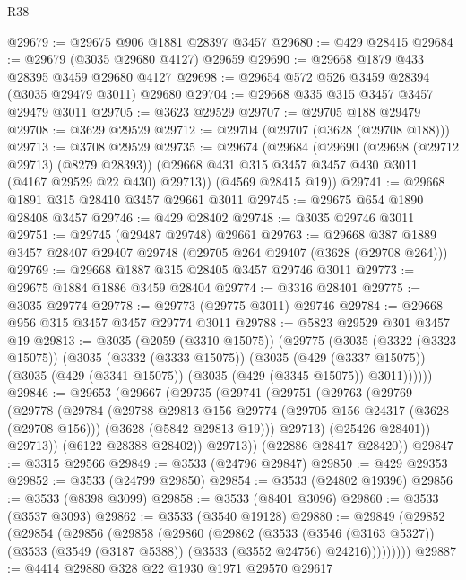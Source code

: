\begin{lexlean}{R38}
\begin{coremodule}
@29679 := @29675 @906 @1881 @28397 @3457
@29680 := @429 @28415
@29684 := @29679 (@3035 @29680 @4127) @29659
@29690 := @29668 @1879 @433 @28395 @3459 @29680 @4127
@29698 := @29654 @572 @526 @3459 @28394 (@3035 @29479 @3011) @29680
@29704 := @29668 @335 @315 @3457 @3457 @29479 @3011
@29705 := @3623 @29529
@29707 := @29705 @188 @29479
@29708 := @3629 @29529
@29712 := @29704 (@29707 (@3628 (@29708 @188)))
@29713 := @3708 @29529
@29735 := @29674
    (@29684
      (@29690
        (@29698 (@29712 @29713) (@8279 @28393))
        (@29668 @431 @315 @3457 @3457 @430 @3011 (@4167 @29529 @22 @430) @29713))
      (@4569 @28415 @19))
@29741 := @29668 @1891 @315 @28410 @3457 @29661 @3011
@29745 := @29675 @654 @1890 @28408 @3457
@29746 := @429 @28402
@29748 := @3035 @29746 @3011
@29751 := @29745 (@29487 @29748) @29661
@29763 := @29668 @387 @1889 @3457 @28407 @29407 @29748 (@29705 @264 @29407 (@3628 (@29708 @264)))
@29769 := @29668 @1887 @315 @28405 @3457 @29746 @3011
@29773 := @29675 @1884 @1886 @3459 @28404
@29774 := @3316 @28401
@29775 := @3035 @29774
@29778 := @29773 (@29775 @3011) @29746
@29784 := @29668 @956 @315 @3457 @3457 @29774 @3011
@29788 := @5823 @29529 @301 @3457 @19
@29813 := @3035
    (@2059 (@3310 @15075))
    (@29775
      (@3035
        (@3322 (@3323 @15075))
        (@3035
          (@3332 (@3333 @15075))
          (@3035
            (@429 (@3337 @15075))
            (@3035 (@429 (@3341 @15075)) (@3035 (@429 (@3345 @15075)) @3011))))))
@29846 := @29653
    (@29667
      (@29735
        (@29741
          (@29751
            (@29763
              (@29769
                (@29778
                  (@29784
                    (@29788
                      @29813
                      @156
                      @29774
                      (@29705 @156 @24317 (@3628 (@29708 @156)))
                      (@3628 (@5842 @29813 @19)))
                    @29713)
                  (@25426 @28401))
                @29713))
            (@6122 @28388 @28402))
          @29713))
      (@22886 @28417 @28420))
@29847 := @3315 @29566
@29849 := @3533 (@24796 @29847)
@29850 := @429 @29353
@29852 := @3533 (@24799 @29850)
@29854 := @3533 (@24802 @19396)
@29856 := @3533 (@8398 @3099)
@29858 := @3533 (@8401 @3096)
@29860 := @3533 (@3537 @3093)
@29862 := @3533 (@3540 @19128)
@29880 := @29849
    (@29852
      (@29854
        (@29856
          (@29858
            (@29860
              (@29862
                (@3533
                  (@3546 (@3163 @5327))
                  (@3533 (@3549 (@3187 @5388)) (@3533 (@3552 @24756) @24216)))))))))
@29887 := @4414 @29880 @328 @22 @1930 @1971 @29570 @29617

\end{coremodule}
\end{lexlean}
